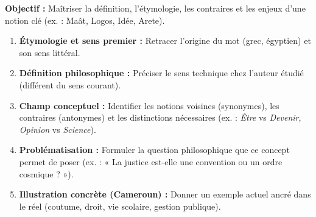\documentclass[11pt]{article}
\begin{document}
\begin{methode}
\textbf{Objectif :} Maîtriser la définition, l'étymologie, les contraires et les enjeux d'une notion clé (ex. : Maât, Logos, Idée, Arete).
\begin{enumerate}
    \item \textbf{Étymologie et sens premier :} Retracer l'origine du mot (grec, égyptien) et son sens littéral.
    \item \textbf{Définition philosophique :} Préciser le sens technique chez l'auteur étudié (différent du sens courant).
    \item \textbf{Champ conceptuel :} Identifier les notions voisines (synonymes), les contraires (antonymes) et les distinctions nécessaires (ex. : \emph{Être} vs \emph{Devenir}, \emph{Opinion} vs \emph{Science}).
    \item \textbf{Problématisation :} Formuler la question philosophique que ce concept permet de poser (ex. : « La justice est-elle une convention ou un ordre cosmique ? »).
    \item \textbf{Illustration concrète (Cameroun) :} Donner un exemple actuel ancré dans le réel (coutume, droit, vie scolaire, gestion publique).
\end{enumerate}
\end{methode}
\end{document}
